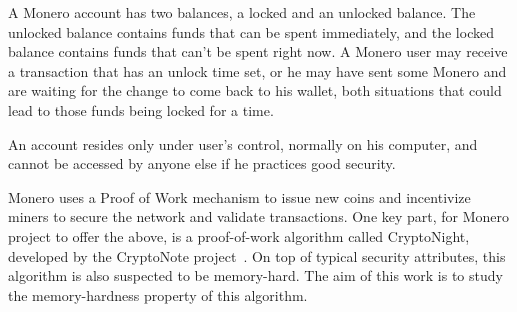 A Monero account has two balances, a locked and an unlocked balance. The unlocked balance contains funds that can be spent immediately, and the locked balance contains funds that can't be spent right now. A Monero user may receive a transaction that has an unlock time set, or he may have sent some Monero and are waiting for the change to come back to his wallet, both situations that could lead to those funds being locked for a time.

An account resides only under user's control, normally on his computer, and cannot be accessed by anyone else if he practices good security.~\cite{getmonero}

Monero uses a Proof of Work mechanism to issue new coins and
incentivize miners to secure the network and validate transactions.
One key part, for Monero project to offer the above, is a proof-of-work algorithm called CryptoNight, developed by the CryptoNote
project~\cite{citeulike:14139412}. On top of typical security attributes, this algorithm is also suspected to be memory-hard. The aim of this work is to study the memory-hardness property of this algorithm.
%
